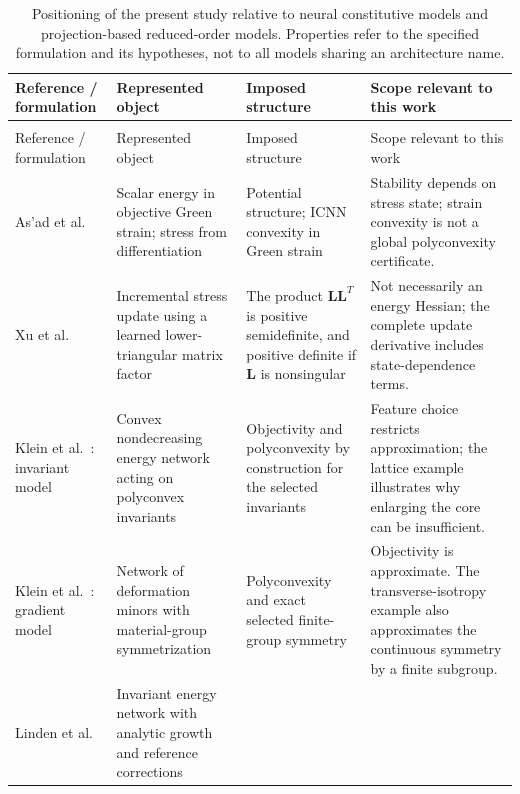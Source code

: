 \begingroup
\footnotesize
\setlength{\tabcolsep}{4pt}
\renewcommand{\arraystretch}{1.06}
\setlength{\LTcapwidth}{\linewidth}
\begin{longtable}{@{}>{\raggedright\arraybackslash}p{2.6cm}>{\raggedright\arraybackslash}p{4.05cm}>{\raggedright\arraybackslash}p{4.15cm}>{\raggedright\arraybackslash}p{4.85cm}@{}}
\caption{Positioning of the present study relative to neural constitutive models and projection-based reduced-order models. Properties refer to the specified formulation and its hypotheses, not to all models sharing an architecture name.}
\label{tab:literature}\\
\toprule
Reference / formulation & Represented object & Imposed structure & Scope relevant to this work\\
\midrule
\endfirsthead
\multicolumn{4}{l}{Table \thetable\ continued}\\
\toprule
Reference / formulation & Represented object & Imposed structure & Scope relevant to this work\\
\midrule
\endhead
\bottomrule
\endfoot
As'ad et al.~\cite{asad2022}
& Scalar energy in objective Green strain; stress from differentiation
& Potential structure; ICNN convexity in Green strain
& Stability depends on stress state; strain convexity is not a global polyconvexity certificate.\\*
\addlinespace
Xu et al.~\cite{Xu2021}
& Incremental stress update using a learned lower-triangular matrix factor
& The product $\bm L\bm L^T$ is positive semidefinite, and positive definite if $\bm L$ is nonsingular
& Not necessarily an energy Hessian; the complete update derivative includes state-dependence terms.\\
\addlinespace
Klein et al.~\cite{klein2022}: invariant model
& Convex nondecreasing energy network acting on polyconvex invariants
& Objectivity and polyconvexity by construction for the selected invariants
& Feature choice restricts approximation; the lattice example illustrates why enlarging the core can be insufficient.\\
\addlinespace
Klein et al.~\cite{klein2022}: gradient model
& Network of deformation minors with material-group symmetrization
& Polyconvexity and exact selected finite-group symmetry
& Objectivity is approximate. The transverse-isotropy example also approximates the continuous symmetry by a finite subgroup.\\
\addlinespace
Linden et al.~\cite{linden2023}
& Invariant energy network with analytic growth and reference corrections

\end{longtable}
